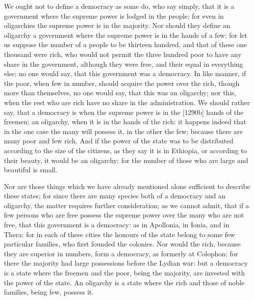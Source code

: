We ought not to define a democracy as some do, who say simply, that it is
a government where the supreme power is lodged in the people; for even in
oligarchies the supreme power is in the majority. Nor should they define
an oligarchy a government where the supreme power is in the hands of a
few: for let us suppose the number of a people to be thirteen hundred, and
that of these one thousand were rich, who would not permit the three
hundred poor to have any share in the government, although they were free,
and their equal in everything else; no one would say, that this government
was a democracy. In like manner, if the poor, when few in number, should
acquire the power over the rich, though more than themselves, no one would
say, that this was an oligarchy; nor this, when the rest who are rich have
no share in the administration. We should rather say, that a democracy is
when the supreme power is in the [1290b] hands of the freemen; an
oligarchy, when it is in the hands of the rich: it happens indeed that in
the one case the many will possess it, in the other the few; because there
are many poor and few rich. And if the power of the state was to be
distributed according to the size of the citizens, as they say it is in
Ethiopia, or according to their beauty, it would be an oligarchy: for the
number of those who are large and beautiful is small.

Nor are those things which we have already mentioned alone sufficient to
describe these states; for since there are many species both of a
democracy and an oligarchy, the matter requires further consideration; as
we cannot admit, that if a few persons who are free possess the supreme
power over the many who are not free, that this government is a democracy:
as in Apollonia, in Ionia, and in Thera: for in each of these cities the
honours of the state belong to some few particular families, who first
founded the colonies. Nor would the rich, because they are superior in
numbers, form a democracy, as formerly at Colophon; for there the majority
had large possessions before the Lydian war: but a democracy is a state
where the freemen and the poor, being the majority, are invested with the
power of the state. An oligarchy is a state where the rich and those of
noble families, being few, possess it.

